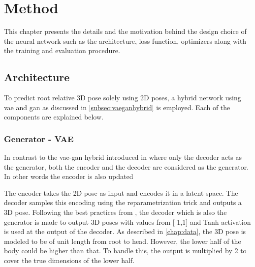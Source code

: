 \chapter{Method}
\label{chap:method}


This chapter presents the details and the motivation behind the design choice of the neural network such as the architecture, loss function, optimizers along with the training and evaluation procedure.

\section{Architecture}
To predict root relative 3D pose solely using 2D poses, a hybrid network using \ac{vae} and \ac{gan} as discussed in \ref{subsec:vaeganhybrid} is employed. Each of the components are explained below.

\subsection{Generator - VAE}
In contrast to the \ac{vae}-\ac{gan} hybrid introduced in \cite{autoencoding_beyond_pixels} where only the decoder acts as the generator, both the encoder and the decoder are considered as the generator. In other words the encoder is also updated 

The encoder takes the 2D pose as input and encodes it in a latent space. The decoder samples this encoding using the reparametrization trick and outputs a 3D pose. Following the best practices from \cite{soumith2017wasserstein}, the decoder which is also the generator is made to output 3D poses with values from [-1,1] and Tanh activation is used at the output of the decoder. As described in \ref{chap:data}, the 3D pose is modeled to be of unit length from root to head. However, the lower half of the body could be higher than that. To handle this, the output is multiplied by 2 to cover the true dimensions of the lower half.


